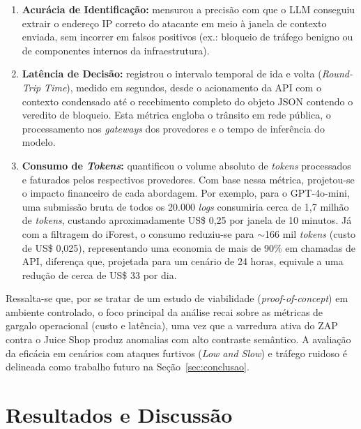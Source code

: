 \documentclass[sigconf, anonymous]{acmart}
\begin{document}
\begin{enumerate}[label=(\roman*)]
    \item \textbf{Acurácia de Identificação:} mensurou a precisão com que o \ac{LLM} conseguiu extrair o endereço IP correto do atacante em meio à janela de contexto enviada, sem incorrer em falsos positivos (ex.: bloqueio de tráfego benigno ou de componentes internos da infraestrutura).
    \item \textbf{Latência de Decisão:} registrou o intervalo temporal de ida e volta (\textit{Round-Trip Time}), medido em segundos, desde o acionamento da \ac{API} com o contexto condensado até o recebimento completo do objeto \ac{JSON} contendo o veredito de bloqueio. Esta métrica engloba o trânsito em rede pública, o processamento nos \textit{gateways} dos provedores e o tempo de inferência do modelo.
    \item \textbf{Consumo de \textit{Tokens}:} quantificou o volume absoluto de \textit{tokens} processados e faturados pelos respectivos provedores. Com base nessa métrica, projetou-se o impacto financeiro de cada abordagem. Por exemplo, para o GPT-4o-mini, uma submissão bruta de todos os 20.000 \textit{logs} consumiria cerca de 1,7 milhão de \textit{tokens}, custando aproximadamente US\$ 0,25 por janela de 10 minutos. Já com a filtragem do iForest, o consumo reduziu-se para $\sim$166 mil \textit{tokens} (custo de US\$ 0,025), representando uma economia de mais de 90\% em chamadas de \ac{API}, diferença que, projetada para um cenário de 24 horas, equivale a uma redução de cerca de US\$ 33 por dia.
\end{enumerate}

Ressalta-se que, por se tratar de um estudo de viabilidade (\textit{proof-of-concept}) em ambiente controlado, o foco principal da análise recai sobre as métricas de gargalo operacional (custo e latência), uma vez que a varredura ativa do ZAP contra o Juice Shop produz anomalias com alto contraste semântico. A avaliação da eficácia em cenários com ataques furtivos (\textit{Low and Slow}) e tráfego ruidoso é delineada como trabalho futuro na Seção~\ref{sec:conclusao}.

\section{Resultados e Discussão}
\label{sec:resultados}
\end{document}
